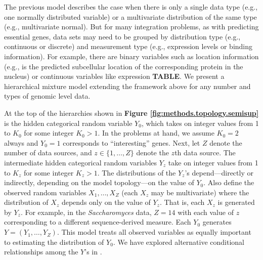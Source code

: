 \documentclass{bmcart}
\begin{document}
The previous model describes the case when there is only a single data type (e.g., one normally distributed 
variable) or a multivariate distribution of the same type (e.g.,  multivariate normal). But for many integration problems, as with 
predicting essential genes, data sets may need to be grouped by distribution type (e.g., continuous or discrete) and 
measurement type (e.g., expression levels or binding information). For example, there are binary variables such as location information (e.g., is the predicted subcellular location of the corresponding protein in the nucleus) or continuous variables like expression \textbf{TABLE}. We present a hierarchical mixture model extending the 
framework above for any number and types of genomic level data.

At the top of the hierarchies shown in \textbf{Figure \ref{fig:methods.topology.semisup}} is the hidden categorical random 
variable $Y_0$, which takes on integer values from 1 to $K_0$ for some integer $K_0 > 1$.  In the problems at hand, we assume 
$K_0 = 2$ always and $Y_0 = 1$ corresponds to ``interesting'' genes.  Next, let $Z$ denote the number of data sources, and $z 
\in \{1, \ldots, Z\}$ denote the $z$th data source.  The intermediate hidden categorical random variables $Y_z$ take on integer 
values from 1 to $K_z$ for some integer $K_z > 1$.  The distributions of the $Y_z$'s depend---directly or indirectly, depending 
on the model topology---on the value of $Y_0$.  Also define the observed random variables $X_1, \ldots, X_Z$ (each $X_z$ may 
be multivariate) where the distribution of $X_z$ depends only on the value of $Y_z$.  That is, each $X_z$ is generated by $Y_z$.   
For example, in the \textit{Saccharomyces} data, $Z = 14$ with each value of $z$ corresponding to a different sequence-derived 
measure. Each $Y_0$ generates $Y = (Y_1, \ldots , Y_Z )$. This model treats all observed variables as equally important to 
estimating the distribution of $Y_0$. We have explored alternative conditional relationships among the $Y$'s in 
\citep{Dvorkin2013b}.
\end{document}

